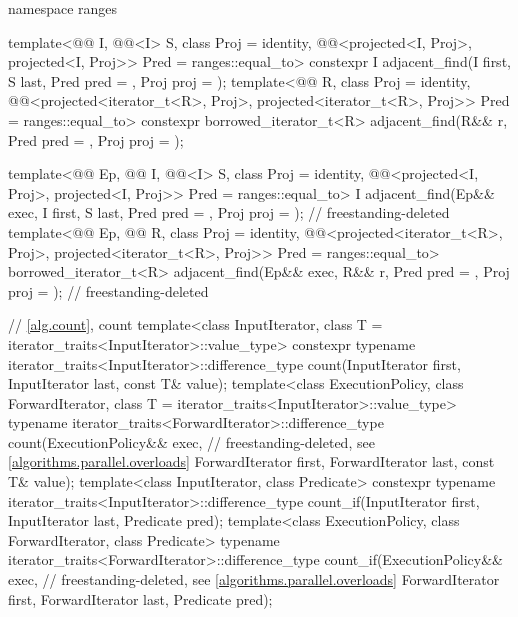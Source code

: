 \begin{codeblock}
{  namespace ranges {
    template<@@ I, @@<I> S, class Proj = identity,
             @@<projected<I, Proj>,
                                       projected<I, Proj>> Pred = ranges::equal_to>
      constexpr I adjacent_find(I first, S last, Pred pred = {},
                                Proj proj = {});
    template<@@ R, class Proj = identity,
             @@<projected<iterator_t<R>, Proj>,
                                       projected<iterator_t<R>, Proj>> Pred = ranges::equal_to>
      constexpr borrowed_iterator_t<R>
        adjacent_find(R&& r, Pred pred = {}, Proj proj = {});

    template<@@ Ep, @@ I, @@<I> S,
             class Proj = identity,
             @@<projected<I, Proj>,
                                       projected<I, Proj>> Pred = ranges::equal_to>
      I adjacent_find(Ep&& exec, I first, S last, Pred pred = {},
                      Proj proj = {});                                      // freestanding-deleted
    template<@@ Ep, @@ R, class Proj = identity,
             @@<projected<iterator_t<R>, Proj>,
                                       projected<iterator_t<R>, Proj>> Pred = ranges::equal_to>
      borrowed_iterator_t<R>
        adjacent_find(Ep&& exec, R&& r, Pred pred = {}, Proj proj = {});    // freestanding-deleted
  }

  // \ref{alg.count}, count
  template<class InputIterator, class T = iterator_traits<InputIterator>::value_type>
    constexpr typename iterator_traits<InputIterator>::difference_type
      count(InputIterator first, InputIterator last, const T& value);
  template<class ExecutionPolicy, class ForwardIterator,
           class T = iterator_traits<InputIterator>::value_type>
    typename iterator_traits<ForwardIterator>::difference_type
      count(ExecutionPolicy&& exec,                             // freestanding-deleted, see \ref{algorithms.parallel.overloads}
            ForwardIterator first, ForwardIterator last, const T& value);
  template<class InputIterator, class Predicate>
    constexpr typename iterator_traits<InputIterator>::difference_type
      count_if(InputIterator first, InputIterator last, Predicate pred);
  template<class ExecutionPolicy, class ForwardIterator, class Predicate>
    typename iterator_traits<ForwardIterator>::difference_type
      count_if(ExecutionPolicy&& exec,                          // freestanding-deleted, see \ref{algorithms.parallel.overloads}
               ForwardIterator first, ForwardIterator last, Predicate pred);

}
\end{codeblock}
